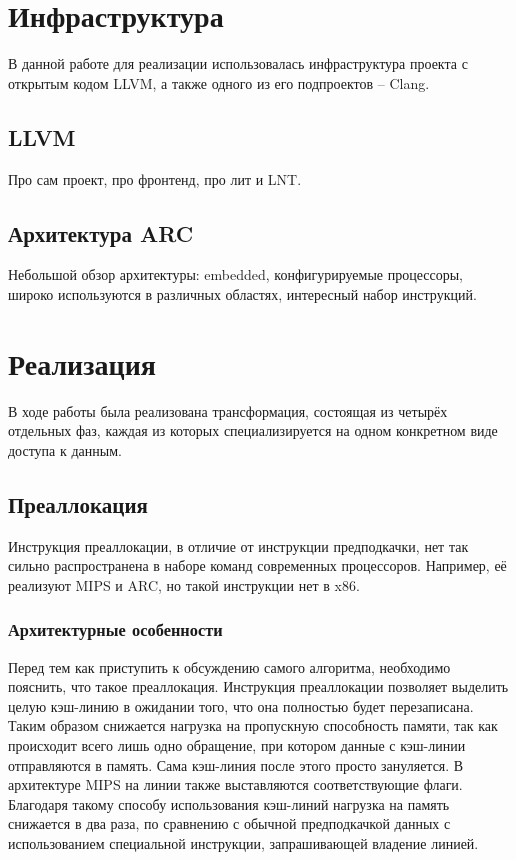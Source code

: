 \documentclass[12pt,a4paper]{article}
\begin{document}
\section{Инфраструктура}

В данной работе для реализации использовалась инфраструктура проекта с открытым кодом LLVM, а также одного из его подпроектов -- Clang.

\subsection{LLVM}

Про сам проект, про фронтенд, про лит и LNT.

\subsection{Архитектура ARC}

Небольшой обзор архитектуры: embedded, конфигурируемые процессоры, широко используются в различных областях, интересный набор инструкций.

\section{Реализация}

\indent

В ходе работы была реализована трансформация, состоящая из четырёх отдельных фаз, каждая из которых специализируется на одном конкретном виде доступа к данным.

\subsection{Преаллокация}

\indent

Инструкция преаллокации, в отличие от инструкции предподкачки, нет так сильно распространена в наборе команд современных процессоров. Например, её реализуют MIPS и ARC, но такой инструкции нет в x86.

\subsubsection{Архитектурные особенности}

\indent

Перед тем как приступить к обсуждению самого алгоритма, необходимо пояснить, что такое преаллокация. Инструкция преаллокации позволяет выделить целую кэш-линию в ожидании того, что она полностью будет перезаписана. Таким образом снижается нагрузка на пропускную способность памяти, так как происходит всего лишь одно обращение, при котором данные с кэш-линии отправляются в память. Сама кэш-линия после этого просто зануляется. В архитектуре MIPS на линии также выставляются соответствующие флаги. Благодаря такому способу использования кэш-линий нагрузка на память снижается в два раза, по сравнению с обычной предподкачкой данных с использованием специальной инструкции, запрашивающей владение линией.
\end{document}
